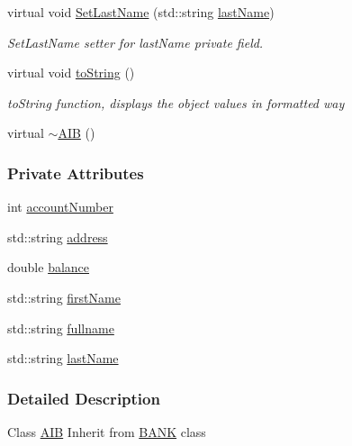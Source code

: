 \begin{DoxyCompactItemize}
virtual void \hyperlink{class_a_i_b_afe4e3c7b481bf87437968dde2cc75882_afe4e3c7b481bf87437968dde2cc75882}{Set\+Last\+Name} (std\+::string \hyperlink{class_a_i_b_ace7b8b648d1b44b7ee2f4be002952b7a_ace7b8b648d1b44b7ee2f4be002952b7a}{last\+Name})
\begin{DoxyCompactList}\small\item\em Set\+Last\+Name setter for last\+Name private field. \end{DoxyCompactList}\item 
virtual void \hyperlink{class_a_i_b_aff0f0a0db75a17efec4bd500b888232d_aff0f0a0db75a17efec4bd500b888232d}{to\+String} ()
\begin{DoxyCompactList}\small\item\em to\+String function, displays the object values in formatted way \end{DoxyCompactList}\item 
virtual \hyperlink{class_a_i_b_a22b11c50b0986326c86315957528bf79_a22b11c50b0986326c86315957528bf79}{$\sim$\+A\+IB} ()
\end{DoxyCompactItemize}
\subsubsection*{Private Attributes}
\begin{DoxyCompactItemize}
\item 
int \hyperlink{class_a_i_b_aafc08efeec5b8c800c32ee32f20603a7_aafc08efeec5b8c800c32ee32f20603a7}{account\+Number}
\item 
std\+::string \hyperlink{class_a_i_b_ae6a67cc33d1e5fa83a52a238e45ca3dc_ae6a67cc33d1e5fa83a52a238e45ca3dc}{address}
\item 
double \hyperlink{class_a_i_b_a3c8d637bd997c1f062d844a88e2559ba_a3c8d637bd997c1f062d844a88e2559ba}{balance}
\item 
std\+::string \hyperlink{class_a_i_b_a869f72057cb63ebf0cfd257069e15c7c_a869f72057cb63ebf0cfd257069e15c7c}{first\+Name}
\item 
std\+::string \hyperlink{class_a_i_b_a818b0cc283af23127c067fb3fc751058_a818b0cc283af23127c067fb3fc751058}{fullname}
\item 
std\+::string \hyperlink{class_a_i_b_ace7b8b648d1b44b7ee2f4be002952b7a_ace7b8b648d1b44b7ee2f4be002952b7a}{last\+Name}
\end{DoxyCompactItemize}


\subsubsection{Detailed Description}
Class \hyperlink{class_a_i_b}{A\+IB} Inherit from \hyperlink{class_b_a_n_k}{B\+A\+NK} class 

